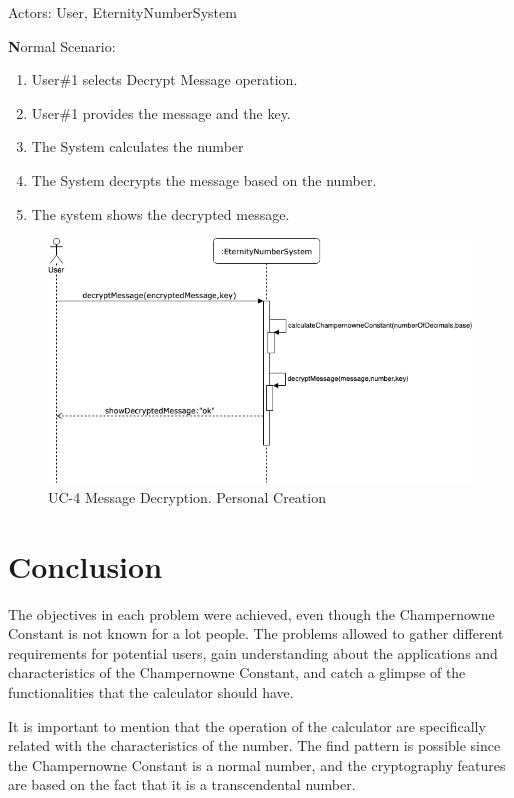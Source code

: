 \documentclass{report}
\begin{document}
Actors: User, EternityNumberSystem

\textbf Normal Scenario:
\begin{enumerate}
\item User\#1 selects Decrypt Message operation.
\item User\#1 provides the message and the key.
\item The System calculates the number
\item The System decrypts the message based on the number.
\item The system shows the decrypted message.
\newline
\end{enumerate}

\begin{figure}[H]
\includegraphics[scale=0.75]{images/messageDecryption.png}
\caption[UC-4 Message Decryption]{UC-4 Message Decryption. Personal Creation}
\end{figure}
\chapter{Conclusion}

The objectives in each problem were achieved, even though the Champernowne Constant is not known for a lot people. The problems allowed to gather different requirements for potential users, gain understanding about the applications and characteristics of the Champernowne Constant, and catch a glimpse of the functionalities that the calculator should have.

It is important to mention that the operation of the calculator are specifically related with the characteristics of the number. The find pattern is possible since the Champernowne Constant is a normal number, and the cryptography features are based on the fact that it is a transcendental number.
\end{document}
